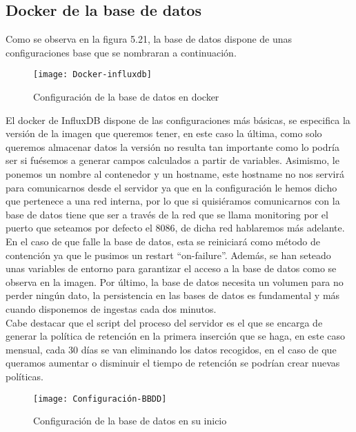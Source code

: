 \documentclass[ spanish, a4paper, 12pt, oneside]{report}
\begin{document}
\subsection{Docker de la base de datos}
Como se observa en la figura 5.21, la base de datos dispone de unas configuraciones base que se nombraran a continuación.\\

\begin{figure}[!h]
   \centering
   \texttt{[image: Docker-influxdb]}\\
      \caption{\label{fig: Configuración de la base de datos en docker} Configuración de la base de datos en docker}
\end{figure}

El docker de InfluxDB dispone de las configuraciones más básicas, se especifica la versión de la imagen que queremos tener, en este caso la última, como solo queremos almacenar datos la versión no resulta tan importante como lo podría ser si fuésemos a generar campos calculados a partir de variables. Asimismo, le ponemos un nombre al contenedor y un 
hostname, este hostname no nos servirá para comunicarnos desde el servidor ya que en la configuración le hemos dicho que pertenece a una red interna, por lo que si quisiéramos comunicarnos con la base de datos tiene que ser a través de la red que se llama monitoring por el puerto que seteamos por defecto el 8086, de dicha red hablaremos más adelante. En 
el caso de que falle la base de datos, esta se reiniciará como método de contención ya que le pusimos un restart ``on-failure''. Además, se han seteado unas variables de entorno para garantizar el acceso a la base de datos como se observa en la imagen. Por último, la base de datos necesita un volumen para no perder ningún dato, la persistencia en las bases de 
datos es fundamental y más cuando disponemos de ingestas cada dos minutos.\\

Cabe destacar que el script del proceso del servidor es el que se encarga de generar la política de retención en la primera inserción que se haga, en este caso mensual, cada 30 días se van eliminando los datos recogidos, en el caso de que queramos aumentar o disminuir el tiempo de retención se podrían crear nuevas políticas. \\

\begin{figure}[!h]
   \centering
   \texttt{[image: Configuración-BBDD]}\\
      \caption{\label{fig: Configuración de la base de datos en su inicio} Configuración de la base de datos en su inicio}
\end{figure}
\end{document}
